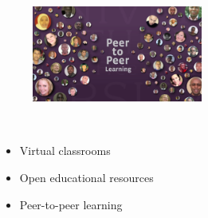 \documentclass{beamer}
\begin{document}
\begin{spacing}{1.2}
\begin{frame}
	\begin{figure}
	\end{figure}
	
	\begin{figure}
		\vspace{-16.9pt}
		\includegraphics[width=0.5\textwidth]{peer-to-peer.png}
	\end{figure}
	\
	\begin{itemize}
		\item Virtual classrooms
		\item Open educational resources
		\item Peer-to-peer learning
	\end{itemize}
	

\end{frame}
\end{spacing}
\end{document}

